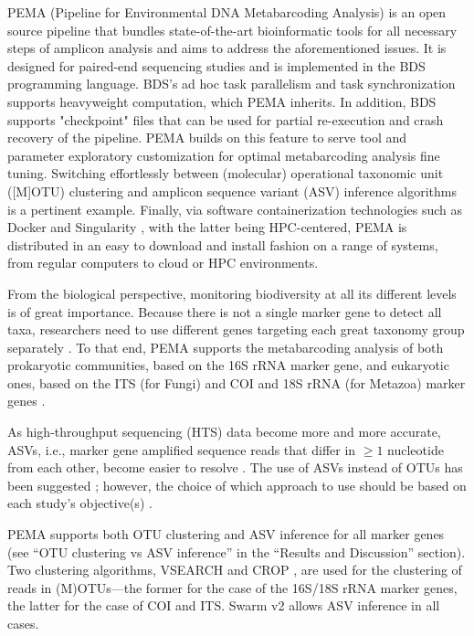    PEMA (Pipeline for Environmental DNA Metabarcoding Analysis) is an open source pipeline that bundles state-of-the-art bioinformatic tools for all necessary steps of amplicon analysis and aims to address the aforementioned issues. 
   It is designed for paired-end sequencing studies and is implemented in the BDS \citep{cingolani2015bigdatascript} programming language. 
   BDS's ad hoc task parallelism and task synchronization supports heavyweight computation, which PEMA inherits. 
   In addition, BDS supports "checkpoint" files that can be used for partial re-execution and crash recovery of the pipeline. 
   PEMA builds on this feature to serve tool and parameter exploratory customization for optimal metabarcoding analysis fine tuning.
   Switching effortlessly between (molecular) operational taxonomic unit ([M]OTU) clustering and amplicon sequence variant (ASV) inference algorithms is a pertinent example. 
   Finally, via software containerization technologies such as Docker \citep{rad2017introduction} and Singularity \citep{kurtzer2017singularity}, with the latter being HPC-centered, PEMA is distributed in an easy to download and install fashion on a range of systems, from regular computers to cloud or HPC environments.
   
   From the biological perspective, monitoring biodiversity at all its different levels is of great importance. Because there is not a single marker gene to detect all taxa, researchers need to use different genes targeting each great taxonomy group separately \citep{coissac2012bioinformatic}. 
   To that end, PEMA supports the metabarcoding analysis of both prokaryotic communities, based on the 16S rRNA marker gene, and eukaryotic ones, based on the ITS (for Fungi) and COI and 18S rRNA (for Metazoa) marker genes \citep{coissac2012bioinformatic}.
   
   As high-throughput sequencing (HTS) data become more and more accurate, ASVs, i.e., marker gene amplified sequence reads that differ in $≥1$ nucleotide from each other, become easier to resolve \citep{callahan2017exact}. 
   The use of ASVs instead of OTUs has been suggested \citep{callahan2017exact}; 
   however, the choice of which approach to use should be based on each study's objective(s) \citep{pauvert2019bioinformatics}.
   
   PEMA supports both OTU clustering and ASV inference for all marker genes 
   (see “OTU clustering vs ASV inference” in the “Results and Discussion” section). 
   Two clustering algorithms, VSEARCH \citep{rognes2016vsearch} and CROP \citep{hao2011clustering}, are used for the clustering of reads in (M)OTUs—the former for the case of the 16S/18S rRNA marker genes, the latter for the case of COI and ITS. 
   Swarm v2 \citep{mahe2015swarm} allows ASV inference in all cases.
   
